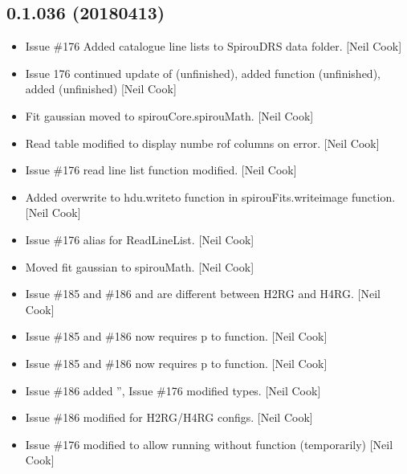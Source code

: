 \documentclass[a4paper,10pt,english]{report}
\begin{document}
\subsection{0.1.036 (2018\sphinxhyphen{}04\sphinxhyphen{}13)}
\label{\detokenize{misc/changelog:id482}}\begin{itemize}
\item {} 
Issue \#176 \sphinxhyphen{} Added catalogue line lists to SpirouDRS data folder.
{[}Neil Cook{]}

\item {} 
Issue 176 \sphinxhyphen{} continued update of  (unfinished),
added  function (unfinished), added 
(unfinished) {[}Neil Cook{]}

\item {} 
Fit gaussian moved to spirouCore.spirouMath. {[}Neil Cook{]}

\item {} 
Read table modified to display numbe rof columns on error. {[}Neil Cook{]}

\item {} 
Issue \#176 \sphinxhyphen{} read line list function modified. {[}Neil Cook{]}

\item {} 
Added overwrite to hdu.writeto function in spirouFits.writeimage
function. {[}Neil Cook{]}

\item {} 
Issue \#176 \sphinxhyphen{} alias for ReadLineList. {[}Neil Cook{]}

\item {} 
Moved fit gaussian to spirouMath. {[}Neil Cook{]}

\item {} 
Issue \#185 and \#186 \sphinxhyphen{}  and  are
different between H2RG and H4RG. {[}Neil Cook{]}

\item {} 
Issue \#185 and \#186 \sphinxhyphen{}  now requires p to function.
{[}Neil Cook{]}

\item {} 
Issue \#185 and \#186 \sphinxhyphen{}  now requires p to function.
{[}Neil Cook{]}

\item {} 
Issue \#186 \sphinxhyphen{} added ”, Issue \#176 \sphinxhyphen{} modified 
types. {[}Neil Cook{]}

\item {} 
Issue \#186 \sphinxhyphen{} modified  for H2RG/H4RG configs. {[}Neil Cook{]}

\item {} 
Issue \#176 \sphinxhyphen{} modified to allow running without function (temporarily)
{[}Neil Cook{]}

\end{itemize}
\end{document}
